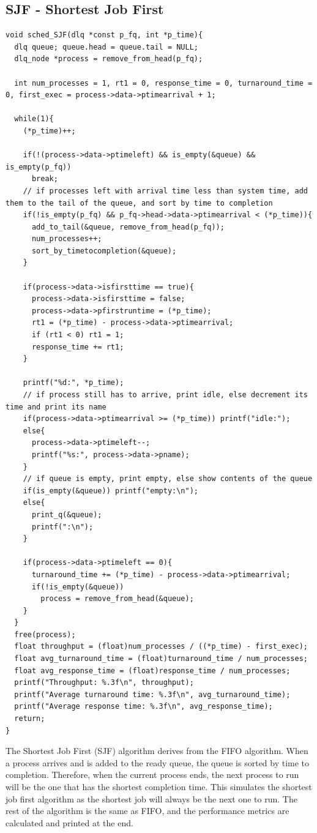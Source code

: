 \documentclass{article}
\theoremstyle{mytheoremstyle}
\theoremstyle{mytheoremstyle}
\theoremstyle{myproblemstyle}
\begin{document}
\subsection{SJF - Shortest Job First}
\begin{lstlisting}[caption={SJF Scheduling Algorithm},label={lst:sjf}]
void sched_SJF(dlq *const p_fq, int *p_time){
  dlq queue; queue.head = queue.tail = NULL;
  dlq_node *process = remove_from_head(p_fq);

  int num_processes = 1, rt1 = 0, response_time = 0, turnaround_time = 0, first_exec = process->data->ptimearrival + 1;

  while(1){
    (*p_time)++;

    if(!(process->data->ptimeleft) && is_empty(&queue) && is_empty(p_fq))
      break;
    // if processes left with arrival time less than system time, add them to the tail of the queue, and sort by time to completion
    if(!is_empty(p_fq) && p_fq->head->data->ptimearrival < (*p_time)){
      add_to_tail(&queue, remove_from_head(p_fq));
      num_processes++;
      sort_by_timetocompletion(&queue);
    }

    if(process->data->isfirsttime == true){
      process->data->isfirsttime = false;
      process->data->pfirstruntime = (*p_time);
      rt1 = (*p_time) - process->data->ptimearrival;
      if (rt1 < 0) rt1 = 1;
      response_time += rt1;
    }

    printf("%d:", *p_time);
    // if process still has to arrive, print idle, else decrement its time and print its name
    if(process->data->ptimearrival >= (*p_time)) printf("idle:");
    else{
      process->data->ptimeleft--;
      printf("%s:", process->data->pname);
    }
    // if queue is empty, print empty, else show contents of the queue
    if(is_empty(&queue)) printf("empty:\n");
    else{
      print_q(&queue);
      printf(":\n");
    }

    if(process->data->ptimeleft == 0){
      turnaround_time += (*p_time) - process->data->ptimearrival;
      if(!is_empty(&queue))
        process = remove_from_head(&queue);
    }
  }
  free(process);
  float throughput = (float)num_processes / ((*p_time) - first_exec);
  float avg_turnaround_time = (float)turnaround_time / num_processes;
  float avg_response_time = (float)response_time / num_processes;
  printf("Throughput: %.3f\n", throughput);
  printf("Average turnaround time: %.3f\n", avg_turnaround_time);
  printf("Average response time: %.3f\n", avg_response_time);
  return;
}
\end{lstlisting}
The Shortest Job First (SJF) algorithm derives from the FIFO algorithm. When a process arrives and is added to the ready queue, the queue is sorted by time to completion. Therefore, when the current process ends, the next process to run will be the one that has the shortest completion time. This simulates the shortest job first algorithm as the shortest job will always be the next one to run. The rest of the algorithm is the same as FIFO, and the performance metrics are calculated and printed at the end.
\end{document}
